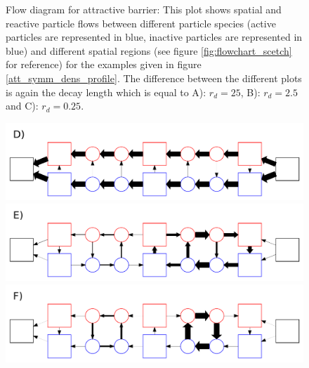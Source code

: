 \begin{minipage}[t]{.372 \textwidth}
    \vspace{.5 cm}
    \begin{figure}[H]
        \caption{Flow diagram for attractive barrier: This plot shows spatial and reactive particle flows between different particle species (active particles are represented in blue, inactive particles are represented in blue) and different spatial regions (see figure \ref{fig:flowchart_scetch} for reference) for the examples given in figure \ref{att_symm_dens_profile}. The difference between the different plots is again the decay length which is equal to \newline A): $r_d=25$, B): $r_d=2.5$ and \newline C): $r_d = 0.25$.
    \label{fig:flow_attractive}}
    \end{figure}
\end{minipage}\hspace{0.02 \textwidth}\begin{minipage}[t]{.608 \textwidth}
    \begin{figure}[H]
        \includegraphics[width = 1 \textwidth]{plots/att_flowchart0.pdf}
        \includegraphics[width = 1 \textwidth]{plots/att_flowchart1.pdf}
        \includegraphics[width = 1 \textwidth]{plots/att_flowchart2.pdf}
    \end{figure}
\end{minipage}
